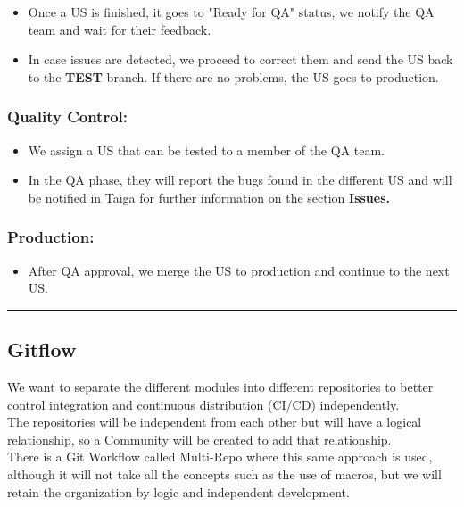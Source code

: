 \documentclass{article}
\providecommand{\tightlist}{
  \setlength{\itemsep}{0pt}\setlength{\parskip}{0pt}}
\begin{document}
\begin{itemize}
\tightlist
\item
  Once a US is finished, it goes to "Ready for QA" status, we notify the
  QA team and wait for their feedback.
\item
  In case issues are detected, we proceed to correct them and send the
  US back to the \textbf{TEST} branch. If there are no problems, the US
  goes to production.
\end{itemize}

\hypertarget{qualitycontrolnbsp}{
\subsubsection{Quality Control:~}\label{qualitycontrolnbsp}}

\begin{itemize}
\tightlist
\item
  We assign a US that can be tested to a member of the QA team.
\item
  In the QA phase, they will report the bugs found in the different US
  and will be notified in Taiga for further information on the section
  \textbf{Issues.}
\end{itemize}

\hypertarget{productionnbsp}{
\subsubsection{Production:~}\label{productionnbsp}}

\begin{itemize}
\tightlist
\item
  After QA approval, we merge the US to production and continue to the
  next US.
\end{itemize}

\begin{center}\rule{0.5\linewidth}{0.5pt}\end{center}

\hypertarget{gitflow}{
\subsection{Gitflow}\label{gitflow}}

We want to separate the different modules into different repositories to
better control integration and continuous distribution (CI/CD)
independently.\\
The repositories will be independent from each other but will have a
logical relationship, so a Community will be created to add that
relationship.\\
There is a Git Workflow called Multi-Repo where this same approach is
used, although it will not take all the concepts such as the use of
macros, but we will retain the organization by logic and independent
development.~
\end{document}
